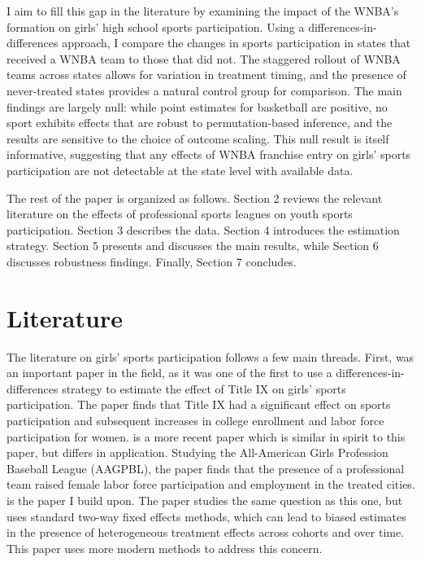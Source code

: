 \documentclass[11pt]{article}
\newcommand{\1}[1]{\mathbb{I}\{#1\}}
\theoremstyle{plain}
\begin{document}
I aim to fill this gap in the literature by examining the impact of the WNBA's formation on girls' high school sports participation. Using a differences-in-differences approach, I compare the changes in sports participation in states that received a WNBA team to those that did not. The staggered rollout of WNBA teams across states allows for variation in treatment timing, and the presence of never-treated states provides a natural control group for comparison. The main findings are largely null: while point estimates for basketball are positive, no sport exhibits effects that are robust to permutation-based inference, and the results are sensitive to the choice of outcome scaling. This null result is itself informative, suggesting that any effects of WNBA franchise entry on girls' sports participation are not detectable at the state level with available data.

The rest of the paper is organized as follows. Section 2 reviews the relevant literature on the effects of professional sports leagues on youth sports participation. Section 3 describes the data. Section 4 introduces the estimation strategy. Section 5 presents  and discusses the main results, while Section 6 discusses robustness findings. Finally, Section 7 concludes.

\section{Literature}

The literature on girls' sports participation follows a few main threads. First, \citet{stevenson_beyond_2010} was an important paper in the field, as it was one of the first to use a differences-in-differences strategy to estimate the effect of Title IX on girls' sports participation. The paper finds that Title IX had a significant effect on sports participation and subsequent increases in college enrollment and labor force participation for women. \citet{beck_female_2022} is a more recent paper which is similar in spirit to this paper, but differs in application. Studying the All-American Girls Profession Baseball League (AAGPBL), the paper finds that the presence of a professional team raised female labor force participation and employment in the treated cities. \citet{reilly_effects_2024} is the paper I build upon. The paper studies the same question as this one, but uses standard two-way fixed effects methods, which can lead to biased estimates in the presence of heterogeneous treatment effects across cohorts and over time. This paper uses more modern methods to address this concern.
\end{document}
